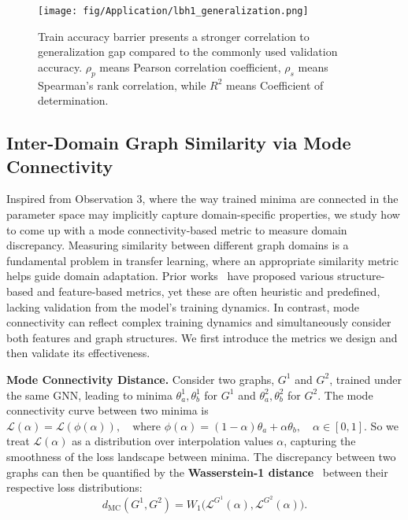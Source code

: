 \begin{figure}
    \centering
    \texttt{[image: fig/Application/lbh1\_generalization.png]}
    \vspace{-0.1in}
    \caption{Train accuracy barrier presents a stronger correlation to generalization gap compared to the commonly used validation accuracy. $\rho_p$ means Pearson correlation coefficient, $\rho_s$ means Spearman's rank correlation, while $R^2$ means Coefficient of determination. }
    \label{fig:compare}
     \vspace{-0.3in}
\end{figure}


\subsection{Inter-Domain Graph Similarity via Mode Connectivity}
\label{subsec:graph_similarity}

Inspired from {Observation 3}, where the way trained minima are connected in the {parameter space} may implicitly capture {domain-specific properties}, we study how to come up with a mode connectivity-based metric to measure domain discrepancy. Measuring similarity between different {graph domains} is a fundamental problem in transfer learning, where an appropriate similarity metric helps guide domain adaptation. Prior works~\cite{JMLR:v13:gretton12a, lee2019domain} have proposed various {structure-based} and {feature-based} metrics, yet these are often {heuristic and predefined}, lacking validation from the model’s training dynamics. In contrast, mode connectivity can reflect complex training dynamics and simultaneously consider both features and graph structures. We first introduce the metrics we design and then validate its effectiveness. 

{\bf Mode Connectivity Distance.}
\label{subsubsec:mc_distance} Consider two graphs, $G^1$ and $G^2$, trained under the same GNN, leading to minima $\theta^1_a, \theta^1_b$ for $G^1$ and $\theta^2_a, \theta^2_b$ for $G^2$. The {mode connectivity curve} between two minima is 
\(
    \mathcal{L}(\alpha) = \mathcal{L}(\phi(\alpha)), \quad \text{where } \phi(\alpha) = (1 - \alpha) \theta_a + \alpha \theta_b, \quad \alpha \in [0,1].
\)
So we treat $\mathcal{L}(\alpha)$ as a {distribution} over interpolation values $\alpha$, capturing the smoothness of the loss landscape between minima. The discrepancy between two graphs can then be quantified by the \textbf{Wasserstein-1 distance}~\citep{ramdas2017wasserstein} between their respective loss distributions:
\begin{equation}
    d_{\text{MC}}(G^1, G^2) = W_1\big(\mathcal{L}^{G^1}(\alpha), \mathcal{L}^{G^2}(\alpha)\big).
\end{equation}

